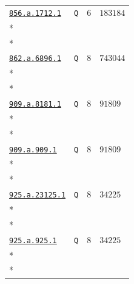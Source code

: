 \documentclass[10pt]{article}
\newcommand{\entryseparator}{\noalign{\vskip3pt\hbox to\linewidth{\leaders\hbox{\kern2pt\rule{3pt}{0.3pt}\kern2pt}\hfill}\nobreak\vskip3pt\nobreak}}
\begin{document}
\begin{landscape}
\begin{longtable}{@{}p{.4\linewidth}>{\centering\arraybackslash}p{.2\linewidth}>{\raggedleft\arraybackslash}p{.16\linewidth}>{\raggedleft\arraybackslash}p{}@{}}
\entryseparator
\href{https://www.lmfdb.org/Genus2Curve/Q/856/a/1712/1}{\texttt{856.a.1712.1}} & \texttt{Q} & $6$ & $183184$ \\*
\multicolumn{4}{@{}l@{}}{$D_{1}=\left(-1,1\right)-\left(1,-1\right)$} \\*
\multicolumn{4}{@{}l@{}}{$D_{2}=2\,\left(0,0\right)-\infty_{Y=-1}-\infty_{Y=0}$} \\
\entryseparator
\href{https://www.lmfdb.org/Genus2Curve/Q/862/a/6896/1}{\texttt{862.a.6896.1}} & \texttt{Q} & $8$ & $743044$ \\*
\multicolumn{4}{@{}l@{}}{$D_{1}=\left(-1,0\right)-\left(0,0\right)$} \\*
\multicolumn{4}{@{}l@{}}{$D_{2}=2\,\left(-\frac{1}{2},0\right)+2\,\left(-\frac{1}{2},\frac{1}{4}\right)-\left(0,0\right)-3\,\infty_{Y=0}$} \\
\entryseparator
\href{https://www.lmfdb.org/Genus2Curve/Q/909/a/8181/1}{\texttt{909.a.8181.1}} & \texttt{Q} & $8$ & $91809$ \\*
\multicolumn{4}{@{}l@{}}{$D_{1}=\left(0,0\right)-\left(1,-1\right)-\left(1,0\right)+\left(\frac{4}{3},-\frac{2}{3}\right)$} \\*
\multicolumn{4}{@{}l@{}}{$D_{2}=\infty_{Y=0}-\left(\frac{4}{3},-\frac{2}{3}\right)$} \\
\entryseparator
\href{https://www.lmfdb.org/Genus2Curve/Q/909/a/909/1}{\texttt{909.a.909.1}} & \texttt{Q} & $8$ & $91809$ \\*
\multicolumn{4}{@{}l@{}}{$D_{1}=\left(0,0\right)-\left(1,-1\right)$} \\*
\multicolumn{4}{@{}l@{}}{$D_{2}=\infty_{Y=-1}-2\,\left(1,-1\right)+\infty_{Y=0}$} \\
\entryseparator
\href{https://www.lmfdb.org/Genus2Curve/Q/925/a/23125/1}{\texttt{925.a.23125.1}} & \texttt{Q} & $8$ & $34225$ \\*
\multicolumn{4}{@{}l@{}}{$D_{1}=\left(0,0\right)-\left(1,-1\right)-\left(1,0\right)+\left(\frac{4}{5},-\frac{2}{5}\right)$} \\*
\multicolumn{4}{@{}l@{}}{$D_{2}=\infty_{Y=0}-\left(\frac{4}{5},-\frac{2}{5}\right)$} \\
\entryseparator
\href{https://www.lmfdb.org/Genus2Curve/Q/925/a/925/1}{\texttt{925.a.925.1}} & \texttt{Q} & $8$ & $34225$ \\*
\multicolumn{4}{@{}l@{}}{$D_{1}=\left(0,-1\right)+\left(0,0\right)-2\,\infty_{Y=0}$} \\*
\multicolumn{4}{@{}l@{}}{$D_{2}=\left(1,-1\right)-\infty_{Y=0}$} \\

\end{longtable}
\end{landscape}
\end{document}
